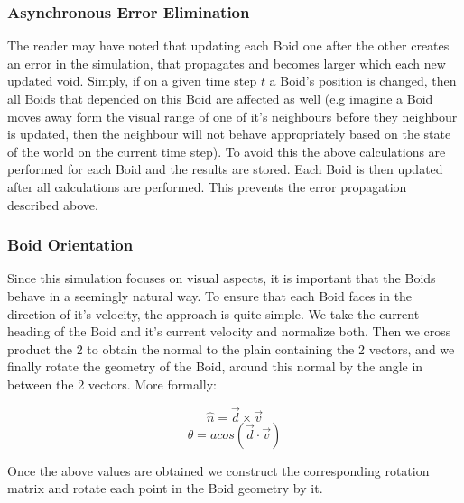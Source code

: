 \documentclass[12pt]{article}
\begin{document}
\subsubsection{Asynchronous Error Elimination}
The reader may have noted that updating each Boid one after the other creates an error in the simulation, that propagates and becomes larger which each new updated void. Simply, if on a given time step $t$ a Boid's position is changed, then all Boids that depended on this Boid are affected as well (e.g imagine a Boid moves away form the visual range of one of it's neighbours before they neighbour is updated, then the neighbour will not behave appropriately based on the state of the world on the current time step). To avoid this the above calculations are performed for each Boid and the results are stored.  Each Boid is then updated after all calculations are performed. This prevents the error propagation described above.

\subsubsection{Boid Orientation}
Since this simulation focuses on visual aspects, it is important that the Boids behave in a seemingly natural way. To ensure that each Boid faces in the direction of it's velocity, the approach is quite simple. We take the current heading of the Boid and it's current velocity and normalize both. Then we cross product the 2 to obtain the normal to the plain containing the 2 vectors, and we finally rotate the geometry of the Boid, around this normal by the angle in between the 2 vectors. More formally:

$$\hat{n}=\vec{d}\times \vec{v}$$
$$\theta = acos(\vec{d}\cdot\vec{v})$$

Once the above values are obtained we construct the corresponding rotation matrix and rotate each point in the Boid geometry by it.
\end{document}
